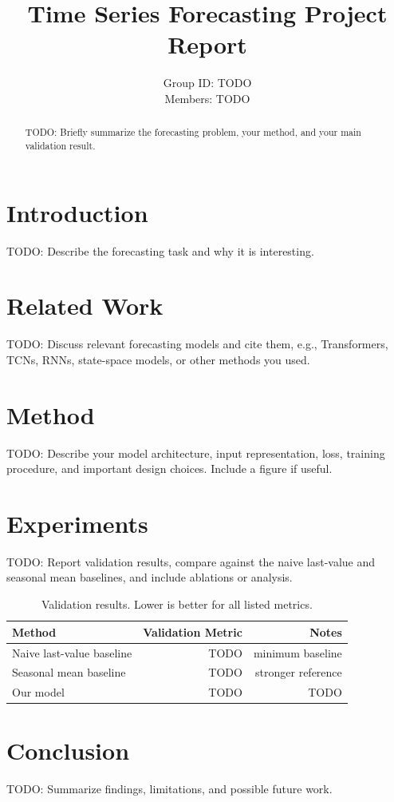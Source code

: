 \documentclass[11pt]{article}
\title{Time Series Forecasting Project Report}
\author{Group ID: TODO \\ Members: TODO}
\date{}
\begin{document}
\maketitle

\begin{abstract}
TODO: Briefly summarize the forecasting problem, your method, and your main validation result.
\end{abstract}

\section{Introduction}
TODO: Describe the forecasting task and why it is interesting.

\section{Related Work}
TODO: Discuss relevant forecasting models and cite them, e.g., Transformers, TCNs, RNNs, state-space models, or other methods you used.

\section{Method}
TODO: Describe your model architecture, input representation, loss, training procedure, and important design choices. Include a figure if useful.

\section{Experiments}
TODO: Report validation results, compare against the naive last-value and seasonal mean baselines, and include ablations or analysis.

\begin{table}[h]
\centering
\begin{tabular}{lrr}
\toprule
Method & Validation Metric & Notes \\
\midrule
Naive last-value baseline & TODO & minimum baseline \\
Seasonal mean baseline & TODO & stronger reference \\
Our model & TODO & TODO \\
\bottomrule
\end{tabular}
\caption{Validation results. Lower is better for all listed metrics.}
\end{table}

\section{Conclusion}
TODO: Summarize findings, limitations, and possible future work.
\end{document}
